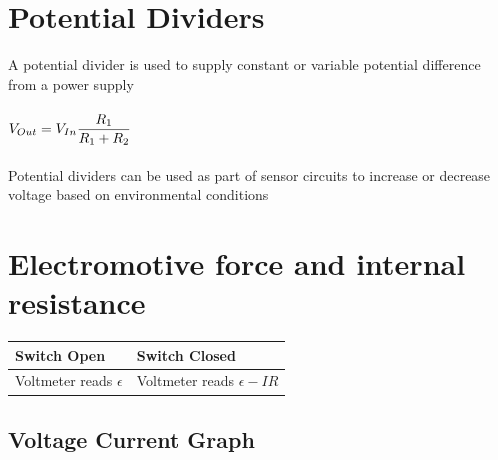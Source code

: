 \documentclass{article}[18pt]
\begin{document}
\section{Potential Dividers}
A potential divider is used to supply constant or variable potential difference from a power supply\\
\\
$\mathlarger{V_{Out}=V_{In}\dfrac{R_1}{R_1+R_2}}$\\
\\
Potential dividers can be used as part of sensor circuits to increase or decrease voltage based on environmental conditions\\
\newpage
\section{Electromotive force and internal resistance}
\begin{tabularx}{\textwidth}{|X|X|}
\hline
Switch Open&Switch Closed\\
\hline
Voltmeter reads $\epsilon$&Voltmeter reads $\epsilon-IR$\\
\hline
\end{tabularx}
\subsection{Voltage Current Graph}
\end{document}

